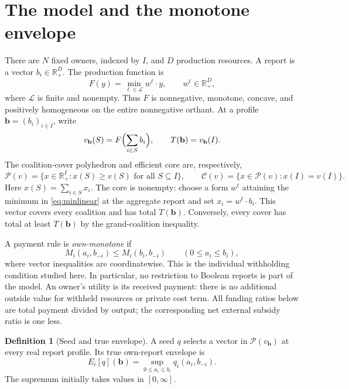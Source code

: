 \documentclass[11pt]{article}
\theoremstyle{definition}
\newtheorem{definition}[theorem]{Definition}
\theoremstyle{remark}
\begin{document}
\section{The model and the monotone envelope}
\label{sec:model}

There are $N$ fixed owners, indexed by $I$, and $D$ production resources.
A report is a vector $b_i\in\mathbb R_+^D$.  The production function is
\begin{equation}
 F(y)=\min_{\ell\in\mathcal L} w^\ell\cdot y,
 \qquad w^\ell\in\mathbb R_+^D,
 \label{eq:minlinear}
\end{equation}
where $\mathcal L$ is finite and nonempty.  Thus $F$ is nonnegative,
monotone, concave, and positively homogeneous on the entire nonnegative
orthant.  At a profile $\mathbf b=(b_i)_{i\in I}$, write
\[
 v_{\mathbf b}(S)=F\Bigl(\sum_{i\in S}b_i\Bigr),
 \qquad T(\mathbf b)=v_{\mathbf b}(I).
\]
The coalition-cover polyhedron and efficient core are, respectively,
\[
 \mathcal P(v)=\{x\in\mathbb R_+^I:x(S)\ge v(S)\text{ for all }S\subseteq I\},
 \qquad
 \mathcal C(v)=\{x\in\mathcal P(v):x(I)=v(I)\}.
\]
Here $x(S)=\sum_{i\in S}x_i$.  The core is nonempty: choose a form
$w^\ell$ attaining the minimum in \eqref{eq:minlinear} at the aggregate
report and set $x_i=w^\ell\cdot b_i$.  This vector covers every coalition
and has total $T(\mathbf b)$.  Conversely, every cover has total at least
$T(\mathbf b)$ by the grand-coalition inequality.

A payment rule is \emph{own-monotone} if
\[
 M_i(a_i,b_{-i})\le M_i(b_i,b_{-i})\qquad(0\le a_i\le b_i),
\]
where vector inequalities are coordinatewise.  This is the individual
withholding condition studied here.  In particular, no restriction to
Boolean reports is part of the model.  An owner's utility is its received
payment: there is no additional outside value for withheld resources or
private cost term.  All funding ratios below are total payment divided by
output; the corresponding net external subsidy ratio is one less.

\begin{definition}[Seed and true envelope]
A seed $q$ selects a vector in $\mathcal P(v_{\mathbf b})$ at every real
report profile.  Its true own-report envelope is
\begin{equation}
 E_i[q](\mathbf b)=\sup_{0\le a_i\le b_i}q_i(a_i,b_{-i}).
 \label{eq:envelope}
\end{equation}
The supremum initially takes values in $[0,\infty]$.
\end{definition}
\end{document}
